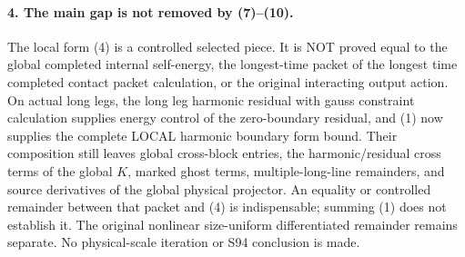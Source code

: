 \documentclass[11pt]{article}
\begin{document}
\paragraph{4. The main gap is not removed by (7)--(10).}
The local form (4) is a controlled selected piece. It is NOT proved
equal to the global completed internal self-energy, the longest-time
packet of the longest time completed contact packet calculation, or the original interacting output action. On actual long
legs, the long leg harmonic residual with gauss constraint calculation supplies energy control of the zero-boundary residual, and
(1) now supplies the complete LOCAL harmonic boundary form bound.
Their composition still leaves global cross-block entries, the
harmonic/residual cross terms of the global $K$, marked ghost terms,
multiple-long-line remainders, and source derivatives of the global
physical projector. An equality or controlled remainder between that
packet and (4) is indispensable; summing (1) does not establish it.
The original nonlinear size-uniform differentiated remainder remains
separate. No physical-scale iteration or S94 conclusion is made.
\end{document}
